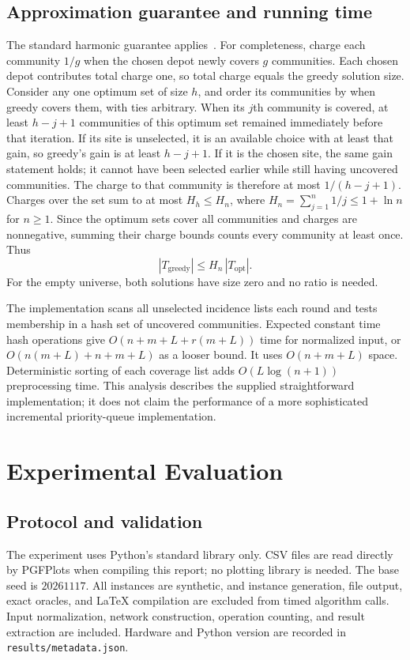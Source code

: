 \documentclass[sigconf,nonacm]{acmart}
\begin{document}
\subsection{Approximation guarantee and running time}
The standard harmonic guarantee applies~\cite{chvatal}. For completeness,
charge each community $1/g$ when the chosen depot newly covers $g$
communities. Each chosen depot contributes total charge one, so total charge
equals the greedy solution size. Consider any one optimum set of size $h$,
and order its communities by when greedy covers them, with ties arbitrary.
When its $j$th community is covered, at least $h-j+1$ communities of this
optimum set remained immediately before that iteration. If its site is
unselected, it is an available choice with at least that gain, so greedy's
gain is at least $h-j+1$. If it is the chosen site, the same gain statement
holds; it cannot have been selected earlier while still having uncovered
communities. The charge to that community is therefore at most
$1/(h-j+1)$. Charges over the set sum to at most $H_h\le H_n$, where
$H_n=\sum_{j=1}^n1/j\le1+\ln n$ for $n\ge1$.
Since the optimum sets cover all communities and charges are nonnegative,
summing their charge bounds counts every community at least once. Thus
\[
 |T_{\mathrm{greedy}}|\le H_n\,|T_{\mathrm{opt}}|.
\]
For the empty universe, both solutions have size zero and no ratio is needed.

The implementation scans all unselected incidence lists each round and
tests membership in a hash set of uncovered communities. Expected constant
time hash operations give $O(n+m+L+r(m+L))$ time for normalized input, or
$O(n(m+L)+n+m+L)$ as a looser bound. It uses $O(n+m+L)$ space.
Deterministic sorting of each coverage list adds
$O(L\log(n+1))$ preprocessing time. This analysis describes the supplied
straightforward implementation; it does not claim the performance of a
more sophisticated incremental priority-queue implementation.

\section{Experimental Evaluation}
\subsection{Protocol and validation}
The experiment uses Python's standard library only. CSV files are read
directly by PGFPlots when compiling this report; no plotting library is
needed. The base seed is $20261117$. All instances are synthetic, and
instance generation, file output, exact oracles, and LaTeX compilation are
excluded from timed algorithm calls. Input normalization, network construction,
operation counting, and result extraction are included. Hardware and Python
version are recorded in \texttt{results/metadata.json}.
\end{document}
